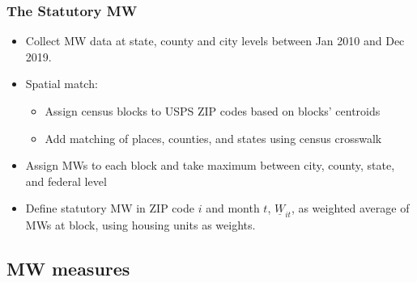 \documentclass[aspectratio=169, t]{beamer}
\newcommand{\MW}{\underline{W}}
\begin{document}
\begin{frame}[label=stat_MW]
    \frametitle{The Statutory MW}
    
    \begin{itemize}
        \item
        Collect MW data at state, county and city levels between Jan 2010 and Dec 2019.
        
        \vspace{2mm}
        \item
        Spatial match:
        \begin{itemize}
            \item Assign census blocks to USPS ZIP codes based on blocks' centroids
            \item Add matching of places, counties, and states using census crosswalk
        \end{itemize}
        
        \vspace{2mm}
        \item
        Assign MWs to each block and take maximum between city, county, state, and federal level
        
        \vspace{2mm}
        \item
        Define statutory MW in ZIP code $i$ and month $t$, $\MW_{it}$, as weighted
        average of MWs at block, using housing units as weights.
         
        \hyperlink{dist_mw_changes}{}

    \end{itemize}
    
\end{frame}

\subsection{MW measures}
\end{document}
